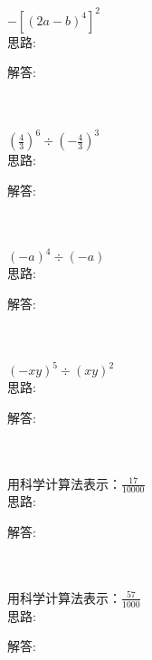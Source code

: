 \item {
    $ -[(2a-b)^{4}]^{2}$ 
    \ifshowSolution
        \fangsong{}
        \\
        思路:

        解答: 
    \else
        \\ \\ \\
    \fi
}

\item {
    $ (\frac{4}{3})^{6}\div (-\frac{4}{3})^{3} $
    \ifshowSolution
        \fangsong{}
        \\
        思路:

        解答: 
    \else
        \\ \\ \\
    \fi
}

\item {
    $ (-a)^{4}\div (-a) $
    \ifshowSolution
        \fangsong{}
        \\
        思路:

        解答: 
    \else
        \\ \\ \\
    \fi
}

\item {
    $ (-xy)^{5}\div (xy)^{2} $
    \ifshowSolution
        \fangsong{}
        \\
        思路:

        解答: 
    \else
        \\ \\ \\
    \fi
}

\item {
    用科学计算法表示：$ \frac{17}{10000} $
    \ifshowSolution
        \fangsong{}
        \\
        思路:

        解答: 
    \else
        \\ \\ \\
    \fi
}

\item {
    用科学计算法表示：$ \frac{57}{1000} $
    \ifshowSolution
        \fangsong{}
        \\
        思路:

        解答: 
    \else
        \\ \\ \\
    \fi
}

